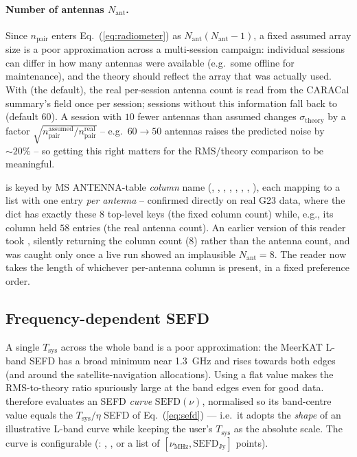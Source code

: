 \documentclass[11pt,a4paper]{article}
\begin{document}
\paragraph{Number of antennas $N_{\mathrm{ant}}$.} Since $n_{\mathrm{pair}}$
enters Eq.~(\ref{eq:radiometer}) as $N_{\mathrm{ant}}(N_{\mathrm{ant}}-1)$, a
fixed assumed array size is a poor approximation across a multi-session
campaign: individual sessions can differ in how many antennas were available
(e.g.\ some offline for maintenance), and the theory should reflect the array
that was actually used. With  (the default), the
real per-session antenna count is read from the CARACal 
summary's  field once per session; sessions without this information
fall back to  (default $60$). A session with $10$ fewer
antennas than assumed changes $\sigma_{\mathrm{theory}}$ by a factor
$\sqrt{n_{\mathrm{pair}}^{\mathrm{assumed}}/n_{\mathrm{pair}}^{\mathrm{real}}}$ --
e.g.\ $60\to50$ antennas raises the predicted noise by $\sim\!20\%$ -- so
getting this right matters for the RMS/theory comparison to be meaningful.

 is keyed by MS ANTENNA-table \emph{column} name (,
, , , ,
, , ), each mapping to a list with one
entry \emph{per antenna} -- confirmed directly on real G23 data, where the
dict has exactly these $8$ top-level keys (the fixed column count) while, e.g.,
its  column held $58$ entries (the real antenna count). An earlier
version of this reader took , silently returning the column
count ($8$) rather than the antenna count, and was caught only once a live run
showed an implausible $N_{\mathrm{ant}}=8$. The reader now takes the length of
whichever per-antenna column is present, in a fixed preference order.

\subsection{Frequency-dependent SEFD}\label{sec:sefd}
A single $T_{\mathrm{sys}}$ across the whole band is a poor approximation: the
MeerKAT L-band SEFD has a broad minimum near \SI{1.3}{GHz} and rises towards both
edges (and around the satellite-navigation allocations). Using a flat value
makes the RMS-to-theory ratio spuriously large at the band edges even for good
data.  therefore evaluates an SEFD \emph{curve}
$\mathrm{SEFD}(\nu)$, normalised so its band-centre value equals the
$T_{\mathrm{sys}}/\eta$ SEFD of Eq.~(\ref{eq:sefd}) --- i.e.\ it adopts the
\emph{shape} of an illustrative L-band curve while keeping the user's
$T_{\mathrm{sys}}$ as the absolute scale. The curve is configurable
(: , , or a list of
$[\nu_{\mathrm{MHz}}, \mathrm{SEFD}_{\mathrm{Jy}}]$ points).
\end{document}
